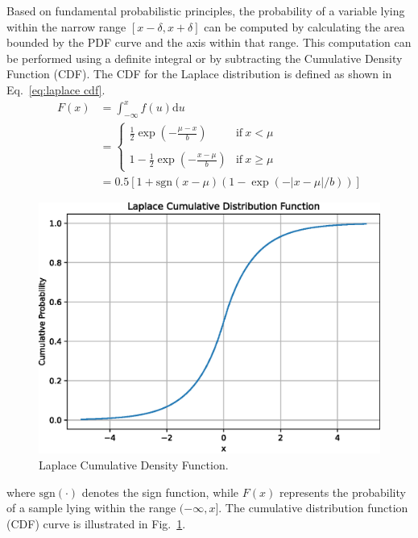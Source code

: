 \documentclass[journal]{IEEEtran}
\begin{document}
		Based on fundamental probabilistic principles, the probability of a variable lying within the narrow range $[x-\delta, x+\delta]$ can be computed by calculating the area bounded by the PDF curve and the axis within that range. This computation can be performed using a definite integral or by subtracting the Cumulative Density Function (CDF). The CDF for the Laplace distribution is defined as shown in Eq.~\eqref{eq:laplace cdf}.
		\begin{equation}\begin{aligned}
		F(x)& =\int_{-\infty}^xf(u)\mathrm{d}u  \\
			&=\begin{cases}\frac12\exp\left(-\frac{\mu-x}b\right)&\mathrm{if~}x<\mu\\
				\\1-\frac12\exp\left(-\frac{x-\mu}b\right)&\mathrm{if~}x\geq\mu\end{cases} \\
			&=0.5\left[1+\mathrm{sgn}(x-\mu)\left(1-\exp(-|x-\mu|/b)\right)\right]
			\label{eq:laplace cdf}
		\end{aligned}\end{equation}
		\begin{figure}[!t]
		\centering
		\includegraphics[width=1.0\linewidth]{Figures/laplace/laplace_cdf}
		\caption{Laplace Cumulative Density Function.}
		\label{fig:laplace distribution cdf}
		\end{figure}
	
		where $\mathrm{sgn}(\cdot)$ denotes the sign function, while $F(x)$ represents the probability of a sample lying within the range $(-\infty, x]$. The cumulative distribution function (CDF) curve is illustrated in Fig.~\ref{fig:laplace distribution cdf}.
		
\end{document}
